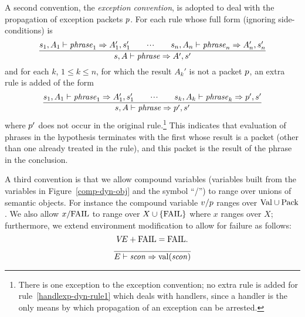 A second convention, the {\sl exception convention}, is adopted to deal
with the propagation of exception packets $p$.
For each rule whose full form (ignoring side-conditions) is
\[ \frac{ s_1,A_1\vdash{\it phrase}_1\Rightarrow A_1',s_1'\qquad\mbox{$\cdot\!\cdot\!\cdot$}\qquad
          s_n,A_n\vdash{\it phrase}_n\Rightarrow A_n',s_n' }
        { s,A\vdash{\it phrase}\Rightarrow A',s'} \]
and for each $k$, $1\leq k\leq n$, for which the result $A_k'$ is not a
packet $p$, an extra rule is added of the form
\[ \frac{ s_1,A_1\vdash{\it phrase}_1\Rightarrow A_1',s_1'\qquad\mbox{$\cdot\!\cdot\!\cdot$}\qquad
          s_k,A_k\vdash{\it phrase}_k\Rightarrow p',s' }
        { s,A\vdash{\it phrase}\Rightarrow p',s'} \]
where $p'$ does not occur in the original rule.\footnote{There is one
exception to the exception convention; no extra rule is added for
rule~\ref{handlexp-dyn-rule1} which deals with handlers,
since a handler is the only
means by which propagation of an exception can be arrested.}
This indicates that evaluation of phrases in the hypothesis terminates with the
first whose result is a packet (other than one already treated in the rule),
and this packet is the result of the phrase in the conclusion.

A third convention is that we allow compound variables (variables built
from the variables in Figure~\ref{comp-dyn-obj} and the symbol ``/'')
to range over unions of semantic objects. For instance
the compound variable $v/p$ ranges
over ${\rm Val}\cup{\rm Pack}$.
We also allow $x/{\rm FAIL}$ to range over $X\cup\{{\rm FAIL}\}$ where $x$
ranges over $X$;
furthermore, we extend environment modification to allow for failure
as follows:
\[\mbox{$V\!E$}+{\rm FAIL}={\rm FAIL}.\]
%
%
\begin{equation}	%
\frac{}
     {\E\ts\scon\ra\sconval(\scon)}\index{51.15}
\end{equation}



